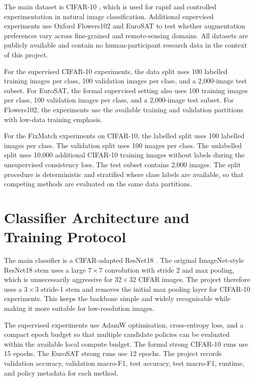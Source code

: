 \documentclass[12pt,a4paper]{report}
\begin{document}
The main dataset is CIFAR-10 \citep{krizhevsky2009learning}, which is used for rapid and controlled experimentation in natural image classification. Additional supervised experiments use Oxford Flowers102 \citep{nilsback2008automated} and EuroSAT \citep{helber2019eurosat} to test whether augmentation preferences vary across fine-grained and remote-sensing domains. All datasets are publicly available and contain no human-participant research data in the context of this project.

For the supervised CIFAR-10 experiments, the data split uses 100 labelled training images per class, 100 validation images per class, and a 2,000-image test subset. For EuroSAT, the formal supervised setting also uses 100 training images per class, 100 validation images per class, and a 2,000-image test subset. For Flowers102, the experiments use the available training and validation partitions with low-data training emphasis.

For the FixMatch experiments on CIFAR-10, the labelled split uses 100 labelled images per class. The validation split uses 100 images per class. The unlabelled split uses 10,000 additional CIFAR-10 training images without labels during the unsupervised consistency loss. The test subset contains 2,000 images. The split procedure is deterministic and stratified where class labels are available, so that competing methods are evaluated on the same data partitions.

\section{Classifier Architecture and Training Protocol}

The main classifier is a CIFAR-adapted ResNet18 \citep{he2016deep}. The original ImageNet-style ResNet18 stem uses a large $7 \times 7$ convolution with stride 2 and max pooling, which is unnecessarily aggressive for $32 \times 32$ CIFAR images. The project therefore uses a $3 \times 3$ stride-1 stem and removes the initial max pooling layer for CIFAR-10 experiments. This keeps the backbone simple and widely recognisable while making it more suitable for low-resolution images.

The supervised experiments use AdamW optimisation, cross-entropy loss, and a compact epoch budget so that multiple candidate policies can be evaluated within the available local compute budget. The formal strong CIFAR-10 runs use 15 epochs. The EuroSAT strong runs use 12 epochs. The project records validation accuracy, validation macro-F1, test accuracy, test macro-F1, runtime, and policy metadata for each method.
\end{document}
